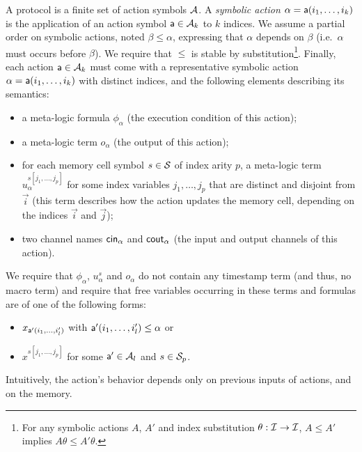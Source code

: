 \begin{definition} \label{def:action} \label{def:proto}
  A protocol is a finite set of action symbols $\mathcal{A}$.
  A \emph{symbolic action} $\alpha = \textsf{a}(i_1,\ldots,i_k)$
  is the application of an action symbol $\textsf{a} \in \mathcal{A}_k$
  to $k$ indices.
  We assume a partial order on symbolic actions,
  noted $\beta \leq \alpha$, expressing that $\alpha$ depends on $\beta$ (i.e.\ $\alpha$ must occurs before $\beta$). We require that $\leq$ is stable by substitution\footnote{
    For any symbolic actions $A$, $A'$ and index substitution $\theta : \mathcal{I} \to \mathcal{I}$,
    $A \leq A'$ implies $A\theta \leq A'\theta$.
  }.
  Finally, each action $\textsf{a} \in \mathcal{A}_k$ must come with
  a representative symbolic action $\alpha = \textsf{a}(i_1,\ldots,i_k)$
  with distinct indices,
  and the following elements describing its semantics:
  \begin{itemize}
    \item a meta-logic formula $\phi_{\alpha}$
      (the execution condition of this action);
    \item a meta-logic term $o_{\alpha}$
      (the output of this action);
    \item for each memory cell symbol $s \in \mathcal{S}$ of index arity $p$,
      a meta-logic term $u_{\alpha}^{s[j_1,\ldots,j_p]}$
      for some index variables $j_1,\ldots,j_p$
      that are distinct and disjoint from $\vec{i}$
      (this term describes how the action updates the memory
      cell, depending on the indices $\vec{i}$ and $\vec{j}$);
    \item two channel names $\mathsf{cin}_\alpha$ and $\mathsf{cout}_\alpha$
      (the input and output channels of this action).
  \end{itemize}
  We require that
  $\phi_{\alpha}$, $u_{\alpha}^{s}$ and $o_{\alpha}$ do not contain any
  timestamp term (and thus, no macro term) and require that
  free variables occurring in these terms and formulas are
  of one of the following forms:
  \begin{itemize}
    \item $x_{\textsf{a}'(i_1,\ldots,i'_l)}$
      with $\textsf{a}'(i_1,\ldots,i'_l)\leq \alpha$ or
    \item $x^{s[j_1,\ldots,j_p]}$
      for some $\textsf{a}' \in \mathcal{A}_l$ and $s \in \mathcal{S}_p$.
  \end{itemize}  
  Intuitively, the action's behavior depends only on previous inputs of actions, and on the memory.
\end{definition}

